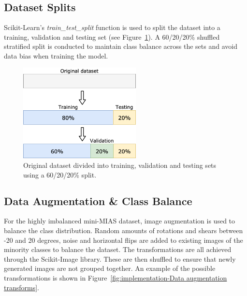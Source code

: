 
\subsection{Dataset Splits}

Scikit-Learn's \textit{train\_test\_split} function is used to split the dataset into a training, validation and testing set (see Figure~\ref{fig:dataset_splits}). A 60/20/20\% shuffled stratified split is conducted to maintain class balance across the sets and avoid data bias when training the model. 

\begin{figure}[ht]
\centerline{\includegraphics[width=0.55\textwidth]{figures/implementation/dataset_splits.png}}
\caption{\label{fig:dataset_splits}Original dataset divided into training, validation and testing sets using a 60/20/20\% split.}
\end{figure}


\subsection{Data Augmentation \& Class Balance}

For the highly imbalanced mini-MIAS dataset, image augmentation is used to balance the class distribution. Random amounts of rotations and shears between -20 and 20 degrees, noise and horizontal flips are added to existing images of the minority classes to balance the dataset. The transformations are all achieved through the Scikit-Image library. These are then shuffled to ensure that newly generated images are not grouped together. An example of the possible transformations is shown in Figure~\ref{fig:implementation-Data augmentation transforms}.\\

